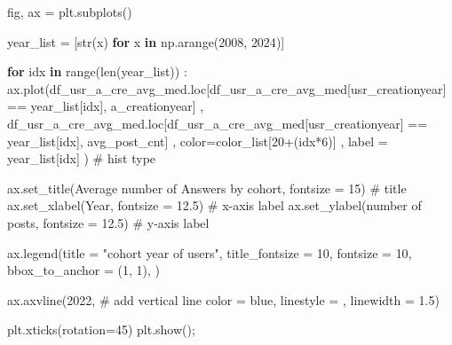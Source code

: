 \documentclass[
  letterpaper,
  DIV=11,
  numbers=noendperiod]{scrartcl}
\newenvironment{Shaded}{\begin{snugshade}}{\end{snugshade}}
\newcommand{\BuiltInTok}[1]{\textcolor[rgb]{0.00,0.23,0.31}{#1}}
\newcommand{\CommentTok}[1]{\textcolor[rgb]{0.37,0.37,0.37}{#1}}
\newcommand{\ControlFlowTok}[1]{\textcolor[rgb]{0.00,0.23,0.31}{\textbf{#1}}}
\newcommand{\DecValTok}[1]{\textcolor[rgb]{0.68,0.00,0.00}{#1}}
\newcommand{\FloatTok}[1]{\textcolor[rgb]{0.68,0.00,0.00}{#1}}
\newcommand{\KeywordTok}[1]{\textcolor[rgb]{0.00,0.23,0.31}{\textbf{#1}}}
\newcommand{\NormalTok}[1]{\textcolor[rgb]{0.00,0.23,0.31}{#1}}
\newcommand{\OperatorTok}[1]{\textcolor[rgb]{0.37,0.37,0.37}{#1}}
\newcommand{\StringTok}[1]{\textcolor[rgb]{0.13,0.47,0.30}{#1}}
\begin{document}
\begin{Shaded}
\begin{Highlighting}[]
\NormalTok{fig, ax }\OperatorTok{=}\NormalTok{ plt.subplots()}

\NormalTok{year\_list }\OperatorTok{=}\NormalTok{ [}\BuiltInTok{str}\NormalTok{(x) }\ControlFlowTok{for}\NormalTok{ x }\KeywordTok{in}\NormalTok{ np.arange(}\DecValTok{2008}\NormalTok{, }\DecValTok{2024}\NormalTok{)]}

\ControlFlowTok{for}\NormalTok{ idx }\KeywordTok{in} \BuiltInTok{range}\NormalTok{(}\BuiltInTok{len}\NormalTok{(year\_list)) :}
\NormalTok{  ax.plot(df\_usr\_a\_cre\_avg\_med.loc[df\_usr\_a\_cre\_avg\_med[}\StringTok{\textquotesingle{}usr\_creationyear\textquotesingle{}}\NormalTok{] }\OperatorTok{==}\NormalTok{ year\_list[idx], }\StringTok{\textquotesingle{}a\_creationyear\textquotesingle{}}\NormalTok{]}
\NormalTok{       ,  df\_usr\_a\_cre\_avg\_med.loc[df\_usr\_a\_cre\_avg\_med[}\StringTok{\textquotesingle{}usr\_creationyear\textquotesingle{}}\NormalTok{] }\OperatorTok{==}\NormalTok{ year\_list[idx], }\StringTok{\textquotesingle{}avg\_post\_cnt\textquotesingle{}}\NormalTok{]}
\NormalTok{       ,  color}\OperatorTok{=}\NormalTok{color\_list[}\DecValTok{20}\OperatorTok{+}\NormalTok{(idx}\OperatorTok{*}\DecValTok{6}\NormalTok{)]}
\NormalTok{      , label }\OperatorTok{=}\NormalTok{ year\_list[idx]}
\NormalTok{        ) }\CommentTok{\# hist type}


\NormalTok{ax.set\_title(}\StringTok{\textquotesingle{}Average number of Answers by cohort\textquotesingle{}}\NormalTok{, fontsize }\OperatorTok{=} \DecValTok{15}\NormalTok{) }\CommentTok{\# title}
\NormalTok{ax.set\_xlabel(}\StringTok{\textquotesingle{}Year\textquotesingle{}}\NormalTok{, fontsize }\OperatorTok{=} \FloatTok{12.5}\NormalTok{) }\CommentTok{\# x{-}axis label}
\NormalTok{ax.set\_ylabel(}\StringTok{\textquotesingle{}number of posts\textquotesingle{}}\NormalTok{, fontsize }\OperatorTok{=} \FloatTok{12.5}\NormalTok{) }\CommentTok{\# y{-}axis label}

\NormalTok{ax.legend(title }\OperatorTok{=} \StringTok{"cohort year of users"}\NormalTok{,}
\NormalTok{          title\_fontsize }\OperatorTok{=} \DecValTok{10}\NormalTok{, fontsize }\OperatorTok{=} \DecValTok{10}\NormalTok{,}
\NormalTok{          bbox\_to\_anchor }\OperatorTok{=}\NormalTok{ (}\DecValTok{1}\NormalTok{, }\DecValTok{1}\NormalTok{), }
\NormalTok{          )}

\NormalTok{ax.axvline(}\StringTok{\textquotesingle{}2022\textquotesingle{}}\NormalTok{, }\CommentTok{\# add vertical line}
\NormalTok{           color }\OperatorTok{=} \StringTok{\textquotesingle{}blue\textquotesingle{}}\NormalTok{,}
\NormalTok{           linestyle }\OperatorTok{=} \StringTok{\textquotesingle{}{-}{-}\textquotesingle{}}\NormalTok{,}
\NormalTok{           linewidth }\OperatorTok{=} \FloatTok{1.5}\NormalTok{)}


\NormalTok{plt.xticks(rotation}\OperatorTok{=}\DecValTok{45}\NormalTok{)}
\NormalTok{plt.show()}\OperatorTok{;}
\end{Highlighting}
\end{Shaded}
\end{document}
